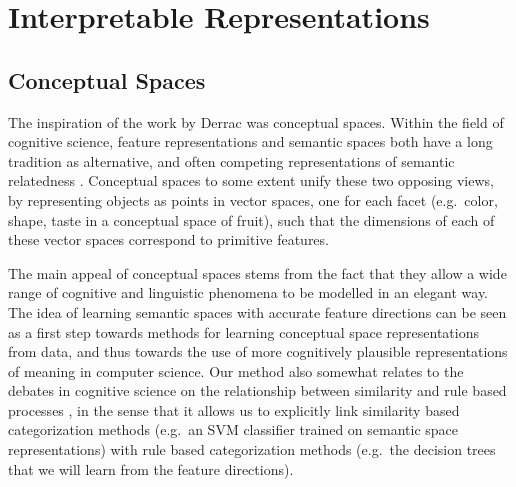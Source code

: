 



\section{Interpretable Representations}\label{ch2:interpretability}

\subsection{Conceptual Spaces}

The inspiration of the work by Derrac \cite{Derrac2015} was conceptual spaces. Within the field of cognitive science, feature representations and semantic spaces both have a long tradition as alternative, and often competing representations of semantic relatedness \cite{tversky1977features}. Conceptual spaces \cite{gardenfors2004conceptual} to some extent unify these two opposing views, by representing objects as points in vector spaces, one for each facet (e.g.\ color, shape, taste in a conceptual space of fruit), such that the dimensions of each of these vector spaces correspond to primitive features. %

The main appeal of conceptual spaces stems from the fact that they allow a wide range of cognitive and linguistic phenomena to be modelled in an elegant way. The idea of learning semantic spaces with accurate feature directions can be seen as a first step towards methods for learning conceptual space representations from data, and thus towards the use of more cognitively plausible representations of meaning in computer science. Our method also somewhat relates to the debates in cognitive science on the relationship between similarity and rule based processes  \cite{HAHN1998197}, in the sense that it allows us to explicitly link similarity based categorization methods (e.g.\ an SVM classifier trained on semantic space representations) with rule based categorization methods (e.g.\ the decision trees that we will learn from the feature directions).

